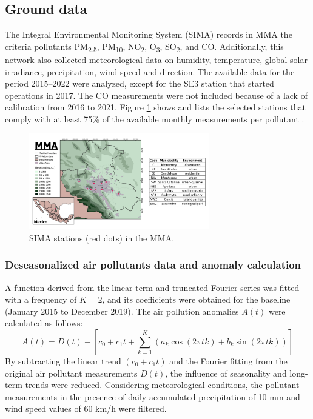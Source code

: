 \documentclass[preprint,12pt]{elsarticle}
\begin{document}
\subsection*{Ground data}
The Integral Environmental Monitoring System (SIMA) records in MMA the criteria pollutants PM\textsubscript{2.5}, PM\textsubscript{10}, NO\textsubscript{2}, O\textsubscript{3}, SO\textsubscript{2}, and CO. Additionally, this network also collected meteorological data on humidity, temperature, global solar irradiance, precipitation, wind speed and direction. The available data for the period 2015--2022 were analyzed, except for the SE3 station that started operations in 2017. The CO measurements were not included because of a lack of calibration from 2016 to 2021. Figure \ref{596247} shows and lists the selected stations that comply with at least 75\% of the available monthly measurements per pollutant \citep{mtodos}.
\begin{figure}[H]
	\begin{center}
		\includegraphics[width=0.70\textwidth]{figures/amm_tabla.png}
		\caption{SIMA stations (red dots) in the MMA.
				{\label{596247}}}
	\end{center}
\end{figure}
\subsubsection*{Deseasonalized air pollutants data and anomaly calculation}
A function derived from the linear term and truncated Fourier series was fitted with a frequency of \(K=2\), and its coefficients were obtained \citep{Hernández-Paniagua2021} for the baseline (January 2015 to December 2019). The air pollution anomalies \(A\left(t\right)\) were calculated as follows:
\begin{equation}
	A\left(t\right)=D\left(t\right)-\left[c_0+c_1t+ \sum_{k=1}^{K}\left(a_{k}\cos(2\pi tk)+b_{k}\sin(2\pi tk)\right)\right]
	\label{eq:anomalies}
\end{equation}
By subtracting the linear trend \((c_{0}+c_{1}t)\) and the Fourier fitting from the original air pollutant measurements \(D(t)\), the influence of seasonality and long-term trends were reduced. Considering meteorological conditions, the pollutant measurements in the presence of daily accumulated precipitation of 10 mm and wind speed values of 60 km/h were filtered.
\end{document}
